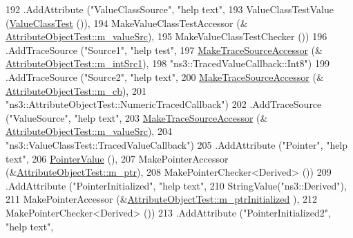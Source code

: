 \begin{DoxyCode}
192       .AddAttribute (\textcolor{stringliteral}{"ValueClassSource"}, \textcolor{stringliteral}{"help text"},
193                      ValueClassTestValue (\hyperlink{classValueClassTest}{ValueClassTest} ()),
194                      MakeValueClassTestAccessor (&
      \hyperlink{classAttributeObjectTest_ab2ecdc19d4525c8d1ef924dea65042b4}{AttributeObjectTest::m\_valueSrc}),
195                      MakeValueClassTestChecker ())
196       .AddTraceSource (\textcolor{stringliteral}{"Source1"}, \textcolor{stringliteral}{"help test"},
197                        \hyperlink{group__tracing_gab21a770b9855af4e8f69f7531ea4a6b0}{MakeTraceSourceAccessor} (&
      \hyperlink{classAttributeObjectTest_a93e2dd383ed17746c8899f08fd5105bf}{AttributeObjectTest::m\_intSrc1}),
198                        \textcolor{stringliteral}{"ns3::TracedValueCallback::Int8"})
199       .AddTraceSource (\textcolor{stringliteral}{"Source2"}, \textcolor{stringliteral}{"help text"},
200                        \hyperlink{group__tracing_gab21a770b9855af4e8f69f7531ea4a6b0}{MakeTraceSourceAccessor} (&
      \hyperlink{classAttributeObjectTest_a7e039b682502ef9705ad1d6214442b9d}{AttributeObjectTest::m\_cb}),
201                        \textcolor{stringliteral}{"ns3::AttributeObjectTest::NumericTracedCallback"})
202       .AddTraceSource (\textcolor{stringliteral}{"ValueSource"}, \textcolor{stringliteral}{"help text"},
203                        \hyperlink{group__tracing_gab21a770b9855af4e8f69f7531ea4a6b0}{MakeTraceSourceAccessor} (&
      \hyperlink{classAttributeObjectTest_ab2ecdc19d4525c8d1ef924dea65042b4}{AttributeObjectTest::m\_valueSrc}),
204                        \textcolor{stringliteral}{"ns3::ValueClassTest::TracedValueCallback"})
205       .AddAttribute (\textcolor{stringliteral}{"Pointer"}, \textcolor{stringliteral}{"help text"},
206                      \hyperlink{classns3_1_1PointerValue}{PointerValue} (),
207                      MakePointerAccessor (&\hyperlink{classAttributeObjectTest_a872972b4d55da842b15ae486e677d4ec}{AttributeObjectTest::m\_ptr}),
208                      MakePointerChecker<Derived> ())
209       .AddAttribute (\textcolor{stringliteral}{"PointerInitialized"}, \textcolor{stringliteral}{"help text"},
210                      StringValue(\textcolor{stringliteral}{"ns3::Derived"}),
211                      MakePointerAccessor (&\hyperlink{classAttributeObjectTest_a9aeef337a9b939b456dd40d3b7af0d40}{AttributeObjectTest::m\_ptrInitialized}
      ),
212                      MakePointerChecker<Derived> ())
213       .AddAttribute (\textcolor{stringliteral}{"PointerInitialized2"}, \textcolor{stringliteral}{"help text"},

\end{DoxyCode}
